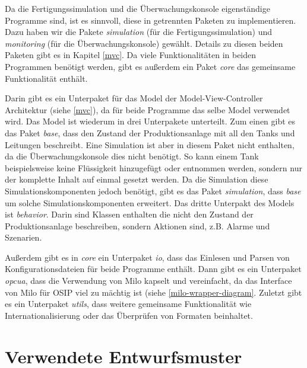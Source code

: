 \documentclass[parskip=full]{scrartcl}
\begin{document}
Da die Fertigungssimulation und die Überwachungskonsole eigenständige Programme sind, ist es sinnvoll, diese in getrennten Paketen zu
implementieren. Dazu haben wir die Pakete \emph{simulation} (für die Fertigungssimulation) und \emph{monitoring} (für die Überwachungskonsole)
gewählt. Details zu diesen beiden Paketen gibt es in Kapitel \ref{mvc}. Da viele Funktionalitäten in beiden Programmen
benötigt werden, gibt es außerdem ein Paket \emph{core} das gemeinsame Funktionalität enthält.

Darin gibt es ein Unterpaket für das Model
der Model-View-Controller Architektur (siehe \ref{mvc}), da für beide Programme das selbe Model verwendet wird. Das Model ist wiederum in
drei Unterpakete unterteilt. Zum einen gibt es das Paket \emph{base}, dass den Zustand der Produktionsanlage mit all den Tanks und Leitungen beschreibt.
Eine Simulation ist aber in diesem Paket nicht enthalten, da die Überwachungskonsole dies nicht benötigt. So kann einem Tank beispielsweise keine Flüssigkeit hinzugefügt oder entnommen werden,
sondern nur der komplette Inhalt auf einmal gesetzt werden. Da die Simulation diese Simulationskomponenten jedoch benötigt,
gibt es das Paket \emph{simulation}, dass \emph{base} um solche Simulationskomponenten erweitert. Das dritte Unterpakt des Models ist \emph{behavior}.
Darin sind Klassen enthalten die nicht den Zustand der Produktionsanlage beschreiben, sondern Aktionen sind, z.B. Alarme und Szenarien.

Außerdem gibt es in \emph{core} ein Unterpaket \emph{io}, dass das Einlesen und Parsen von Konfigurationsdateien für beide Programme enthält. Dann gibt
es ein Unterpaket \emph{opcua}, dass die Verwendung von Milo kapselt und vereinfacht, da das Interface von Milo für OSIP viel zu mächtig
ist (siehe \ref{milo-wrapper-diagram}. Zuletzt gibt es ein Unterpaket \emph{utils}, dass weitere gemeinsame Funktionalität wie Internationalisierung oder das Überprüfen von
Formaten beinhaltet.

\pagebreak
\section{Verwendete Entwurfsmuster}
\end{document}
